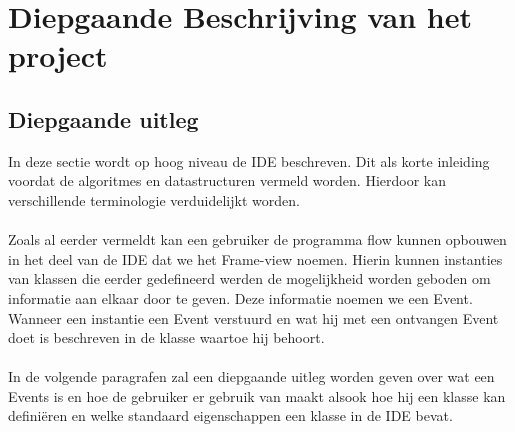 \documentclass[]{article}
\begin{document}
 
\section{Diepgaande Beschrijving van het project}
\label{beschrijf}
 
\subsection{Diepgaande uitleg}
In deze sectie wordt op hoog niveau de IDE beschreven. Dit als korte inleiding voordat de algoritmes en datastructuren vermeld worden. Hierdoor kan verschillende terminologie verduidelijkt worden.\\\\
Zoals al eerder vermeldt kan een gebruiker de programma flow kunnen opbouwen in het deel van de IDE dat we het Frame-view noemen. Hierin kunnen instanties van klassen die eerder gedefineerd werden de mogelijkheid worden geboden om informatie aan elkaar door te geven. Deze informatie noemen we een Event. Wanneer een instantie een Event verstuurd en wat hij met een ontvangen Event doet is beschreven in de klasse waartoe hij behoort.\\\\ In de volgende paragrafen zal een diepgaande uitleg worden geven over wat een Events is en hoe de gebruiker er gebruik van maakt alsook hoe hij een klasse kan defini\"{e}ren en welke standaard eigenschappen een klasse in de IDE bevat.
\end{document}
